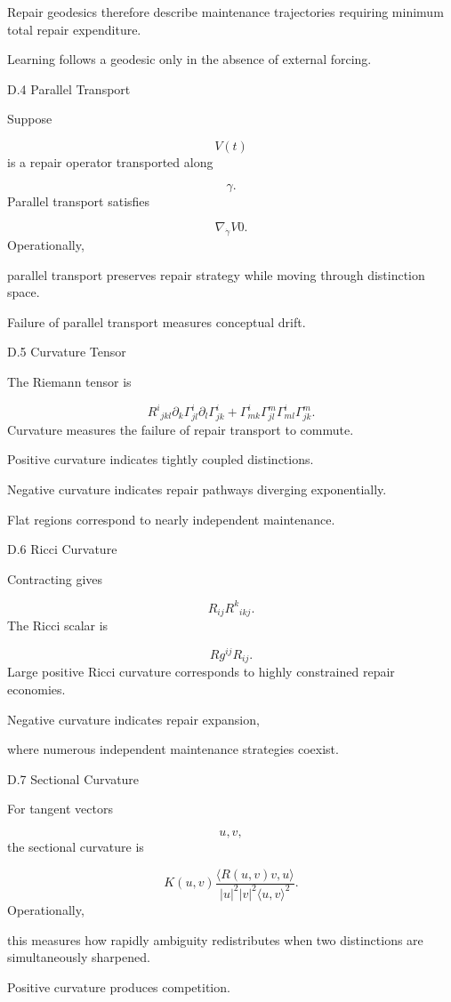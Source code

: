 \documentclass[12pt,oneside]{article}
\theoremstyle{plain}
\theoremstyle{definition}
\theoremstyle{remark}
\begin{document}
Repair geodesics therefore describe maintenance trajectories requiring minimum total repair expenditure.

Learning follows a geodesic only in the absence of external forcing.


D.4 Parallel Transport

Suppose

\[
V(t)
\]
is a repair operator transported along

\[
\gamma.
\]
Parallel transport satisfies

\[
\nabla_{\dot\gamma}
V
0. 
\]
Operationally,

parallel transport preserves repair strategy while moving through distinction space.

Failure of parallel transport measures conceptual drift.


D.5 Curvature Tensor

The Riemann tensor is

\[
R^i{}_{jkl}
\partial_k
\Gamma^i_{jl}
\partial_l
\Gamma^i_{jk}
+
\Gamma^i_{mk}
\Gamma^m_{jl}
\Gamma^i_{ml}
\Gamma^m_{jk}.
\]
Curvature measures the failure of repair transport to commute.

Positive curvature indicates tightly coupled distinctions.

Negative curvature indicates repair pathways diverging exponentially.

Flat regions correspond to nearly independent maintenance.


D.6 Ricci Curvature

Contracting gives

\[
R_{ij}
R^k{}_{ikj}.
\]
The Ricci scalar is

\[
R
g^{ij}
R_{ij}.
\]
Large positive Ricci curvature corresponds to highly constrained repair economies.

Negative curvature indicates repair expansion,

where numerous independent maintenance strategies coexist.


D.7 Sectional Curvature

For tangent vectors

\[
u,v,
\]
the sectional curvature is

\[
K(u,v)
\frac{
\langle
R(u,v)v,
u
\rangle
}
{
|u|^2|v|^2
\langle u,v\rangle^2
}.
\]
Operationally,

this measures how rapidly ambiguity redistributes when two distinctions are simultaneously sharpened.

Positive curvature produces competition.
\end{document}
